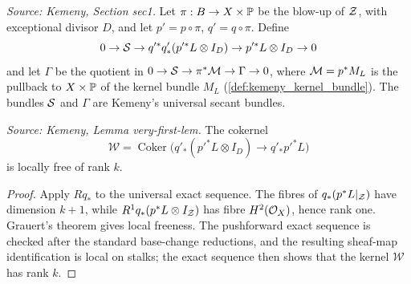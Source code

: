 \begin{definition}
  \label{def:kemeny_universal_secant_bundles}
  \textit{Source: Kemeny, Section sec1.}
  Let \(\pi:B\to X\times\mathbb{P}\) be the blow-up of \(\mathcal{Z}\), with exceptional
  divisor \(D\), and let \(p'=p\circ\pi\), \(q'=q\circ\pi\).  Define
  \[
    0\to\mathcal{S}\to q'^*q'_*(p'^*L\otimes I_D)\to p'^*L\otimes I_D\to0
  \]
  and let \(\Gamma\) be the quotient in
  \(0\to\mathcal{S}\to\pi^*\mathcal{M}\to\Gamma\to0\), where \(\mathcal{M}=p^*M_L\) is the pullback to
  \(X\times\mathbb{P}\) of the kernel bundle \(M_L\) (\cref{def:kemeny_kernel_bundle}).
  The bundles \(\mathcal{S}\) and \(\Gamma\) are Kemeny's universal secant bundles.
\end{definition}

\begin{lemma}
  \label{lem:kemeny_W_locally_free}
  \textit{Source: Kemeny, Lemma very-first-lem.}
  The cokernel
  \[
    \mathcal W=\operatorname{Coker}\bigl(q'_*(p'^*L\otimes I_D)\to q'_*p'^*L\bigr)
  \]
  is locally free of rank \(k\).
\end{lemma}
\begin{proof}
  Apply \(Rq_*\) to the universal exact sequence.  The fibres of
  \(q_*(p^*L|_{\mathcal{Z}})\) have dimension \(k+1\), while
  \(R^1q_*(p^*L\otimes I_{\mathcal{Z}})\) has fibre \(H^2(\mathcal{O}_X)\), hence rank one.
  Grauert's theorem gives local freeness.  The pushforward exact sequence is
  checked after the standard base-change reductions, and the resulting
  sheaf-map identification is local on stalks; the exact sequence then shows
  that the kernel \(\mathcal W\) has rank \(k\).
\end{proof}

